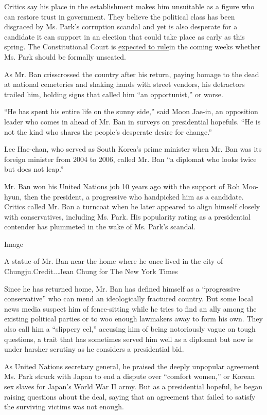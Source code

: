 Critics say his place in the establishment makes him unsuitable as a
figure who can restore trust in government. They believe the political
class has been disgraced by Ms. Park's corruption scandal and yet is
also desperate for a candidate it can support in an election that could
take place as early as this spring. The Constitutional Court is
\href{https://www.nytimes3xbfgragh.onion/2016/12/22/world/asia/south-korea-president-park-impeachment.html}{expected
to rule}in the coming weeks whether Ms. Park should be formally
unseated.

As Mr. Ban crisscrossed the country after his return, paying homage to
the dead at national cemeteries and shaking hands with street vendors,
his detractors trailed him, holding signs that called him ``an
opportunist,'' or worse.

``He has spent his entire life on the sunny side,'' said Moon Jae-in, an
opposition leader who comes in ahead of Mr. Ban in surveys on
presidential hopefuls. ``He is not the kind who shares the people's
desperate desire for change.''

Lee Hae-chan, who served as South Korea's prime minister when Mr. Ban
was its foreign minister from 2004 to 2006, called Mr. Ban ``a diplomat
who looks twice but does not leap.''

Mr. Ban won his United Nations job 10 years ago with the support of Roh
Moo-hyun, then the president, a progressive who handpicked him as a
candidate. Critics called Mr. Ban a turncoat when he later appeared to
align himself closely with conservatives, including Ms. Park. His
popularity rating as a presidential contender has plummeted in the wake
of Ms. Park's scandal.

Image

A statue of Mr. Ban near the home where he once lived in the city of
Chungju.Credit...Jean Chung for The New York Times

Since he has returned home, Mr. Ban has defined himself as a
``progressive conservative'' who can mend an ideologically fractured
country. But some local news media suspect him of fence-sitting while he
tries to find an ally among the existing political parties or to woo
enough lawmakers away to form his own. They also call him a ``slippery
eel,'' accusing him of being notoriously vague on tough questions, a
trait that has sometimes served him well as a diplomat but now is under
harsher scrutiny as he considers a presidential bid.

As United Nations secretary general, he praised the deeply unpopular
agreement Ms. Park struck with Japan to end a dispute over ``comfort
women,'' or Korean sex slaves for Japan's World War II army. But as a
presidential hopeful, he began raising questions about the deal, saying
that an agreement that failed to satisfy the surviving victims was not
enough.

